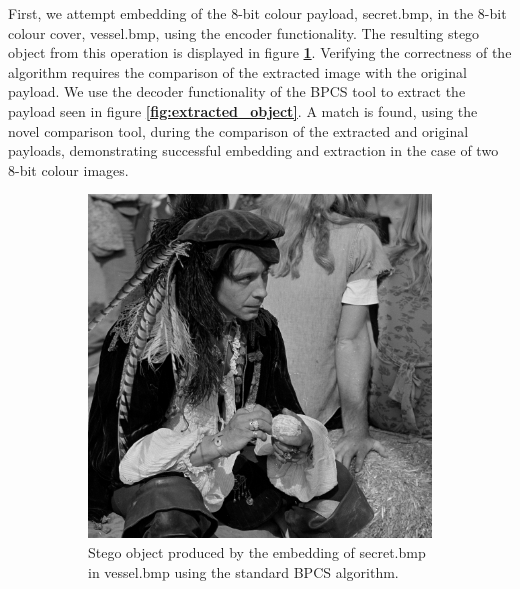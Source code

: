 \documentclass{l4proj}
\begin{document}
First, we attempt embedding of the 8-bit colour payload, secret.bmp, in the 8-bit colour cover, vessel.bmp, using the encoder functionality. The resulting stego object from this operation is displayed in figure \textbf{\ref{fig:stego_grayingray}}. Verifying the correctness of the algorithm requires the comparison of the extracted image with the original payload. We use the decoder functionality of the BPCS tool to extract the payload seen in figure \textbf{\ref{fig:extracted_object}}. A match is found, using the novel comparison tool, during the comparison of the extracted and original payloads, demonstrating successful embedding and extraction in the case of two 8-bit colour images.

\begin{figure}[]
    \centering
    \begin{subfigure}[b]{0.4\textwidth}
        \includegraphics[width=\textwidth]{images/evaluation_grayingray_stego.png}
        \caption{Stego object produced by the embedding of secret.bmp in vessel.bmp using the standard BPCS algorithm.}
        \label{fig:stego_grayingray}
    \end{subfigure}
    \begin{subfigure}[b]{0.4\textwidth}

\end{subfigure}
\end{figure}
\end{document}
